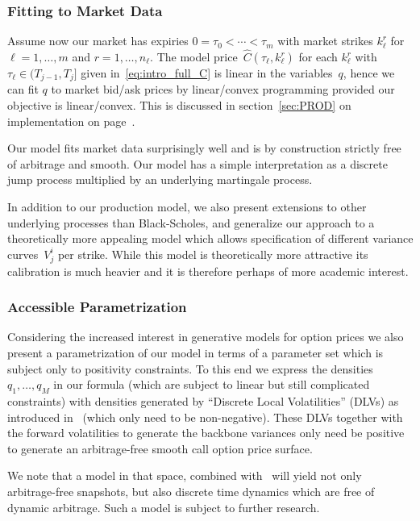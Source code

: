 \documentclass[twoside]{article}
\theoremstyle{plain}
\theoremstyle{definition}
\theoremstyle{remark}
\begin{document}
\subsubsection*{Fitting to Market Data}

Assume now our market has expiries $0=\tau_0<\cdots<\tau_m$ with market strikes $k^r_\ell$ for $\ell=1,\ldots,m$
and $r=1,\ldots,n_\ell$.
The model price~$\hat C(\tau_\ell, k^r_\ell)$ for each $k^r_\ell$ with $\tau_\ell\in (T_{j-1}, T_j]$ given in~\eqref{eq:intro_full_C} is linear in the variables~$q$, hence we can fit $q$ to market bid/ask prices by linear/convex programming provided our objective is linear/convex. This is discussed in 
section~\ref{sec:PROD} on implementation on page~\pageref{sec:PROD}.

Our model fits market data surprisingly well and is by construction strictly free of arbitrage and smooth. Our model has a simple interpretation as a discrete jump process multiplied
by an underlying martingale process.



In addition to our production model, we also present extensions to other underlying processes than Black-Scholes, and generalize our approach to a theoretically more
appealing model  which allows specification of different variance curves~$V^i_j$
per strike. While this model is theoretically more attractive its calibration is much heavier
and it is therefore perhaps of more academic interest.


\subsubsection*{Accessible Parametrization}

Considering the increased interest in generative models for option prices we also present a parametrization
of our model in terms of a parameter set which is subject only to positivity constraints. To this end we express the densities~$q_1,\ldots,q_M$
in our formula (which are subject to linear but still complicated constraints) with densities generated by ``Discrete Local Volatilities'' (DLVs) as introduced in~\cite{DLV} (which only need to be non-negative).
These DLVs together with the forward volatilities to generate the backbone variances only need be positive to generate an arbitrage-free smooth call option
price surface.

We note that a model in that space, combined with~\cite{removedrift, buehler2022deephedginglearningremove} will yield not only arbitrage-free  snapshots, but
also discrete time dynamics which are free of dynamic arbitrage. Such a model is subject to further research.
\end{document}
